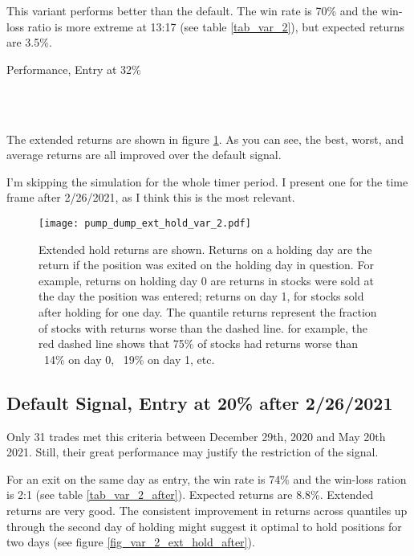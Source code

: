 \documentclass{article}
\begin{document}
This variant performs better than the default. The win rate is 70\% and the win-loss ratio is more extreme at 13:17 (see table \ref{tab_var_2}), but expected returns are 3.5\%. 

\begin{table}
\caption{Performance, Entry at 32\%}
\\[2ex]


\\[2ex]

\label{tab_var_2}
\end{table}

The extended returns are shown in figure \ref{fig_var_2_ext_hold}. As you can see, the best, worst, and average returns are all improved over the default signal.

I'm skipping the simulation for the whole timer period. I present one for the time frame after 2/26/2021, as I think this is the most relevant.

\begin{figure}
\texttt{[image: pump\_dump\_ext\_hold\_var\_2.pdf]}
\caption{Extended hold returns are shown. Returns on a holding day are the return if the position was exited on the holding day in question. For example, returns on holding day 0 are returns in stocks were sold at the day the position was entered; returns on day 1, for stocks sold after holding for one day. The quantile returns represent the fraction of stocks with returns worse than the dashed line. for example, the red dashed line shows that 75\% of stocks had returns worse than ~14\% on day 0, ~19\% on day 1, etc.}
\label{fig_var_2_ext_hold}
\end{figure}

\pagebreak

\subsection{Default Signal, Entry at 20\% after 2/26/2021}

Only 31 trades met this criteria between December 29th, 2020 and May 20th 2021. Still, their great performance may justify the restriction of the signal. 

For an exit on the same day as entry, the win rate is 74\% and the win-loss ration is 2:1 (see table \ref{tab_var_2_after}). Expected returns are 8.8\%. Extended returns are very good. The consistent improvement in returns across quantiles up through the second day of holding might suggest it optimal to hold positions for two days (see figure \ref{fig_var_2_ext_hold_after}).
\end{document}
